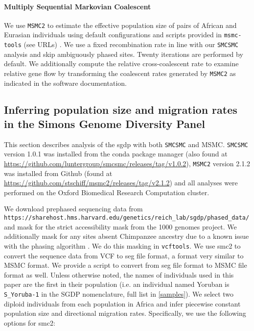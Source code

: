\paragraph{Multiply Sequential Markovian Coalescent} We use {\tt MSMC2} to estimate the effective population size of pairs of African and Eurasian individuals using default configurations and scripts provided in {\tt msmc-tools} (see URLs) \cite{Schiffels2014, Wang2019a}. We use a fixed recombination rate in line with our {\tt SMCSMC} analysis and skip ambiguously phased sites. Twenty iterations are performed by default. We additionally compute the relative cross-coalescent rate to examine relative gene flow by transforming the coalescent rates generated by {\tt MSMC2} as indicated in the software documentation.



\subsection{Inferring population size and migration rates in the Simons Genome Diversity Panel}

This section describes analysis of the \gls{sgdp} with both {\tt SMCSMC} and MSMC. {\tt SMCSMC} version 1.0.1 was installed from the conda package manager (also found at \url{https://github.com/luntergroup/smcsmc/releases/tag/v1.0.2}), {\tt MSMC2} version 2.1.2 was installed from Github (found at \url{https://github.com/stschiff/msmc2/releases/tag/v2.1.2}) and all analyses were performed on the Oxford Biomedical Research Computation cluster.

We download prephased sequencing data from {\tt https://sharehost.hms.harvard.edu/genetics/reich_lab/sgdp/phased_data/} and mask for the strict accessibility mask from the 1000 genomes project. We additionally mask for any sites absent Chimpanzee ancestry due to a known issue with the phasing algorithm \cite{Wang2019a}. We do this masking in {\tt vcftools}. We use \gls{smc2} to convert the sequence data from VCF to seg file format, a format very similar to \gls{MSMC} format. We provide a script to convert from seg file format to \gls{MSMC} file format as well. Unless otherwise noted, the names of individuals used in this paper are the first in their population (i.e. an individual named Yoruban is {\tt S\_Yoruba-1} in the SGDP nomenclature, full list in \ref{samples}).  We select two diploid individuals from each population in Africa  and infer piecewise constant population size and directional migration rates. Specifically, we use the following options for \gls{smc2}:

